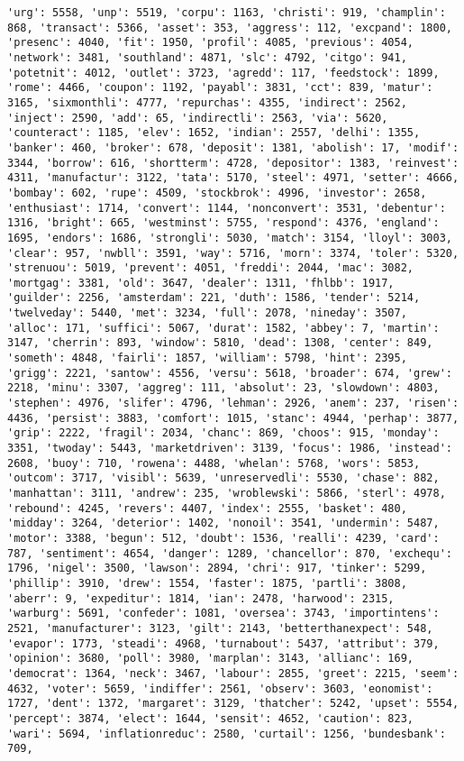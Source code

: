 \documentclass[11pt]{article}
\begin{document}
\begin{Verbatim}[commandchars=\\\{\}]
'urg': 5558, 'unp': 5519, 'corpu': 1163, 'christi': 919, 'champlin': 868, 'transact': 5366, 'asset': 353, 'aggress': 112, 'excpand': 1800, 'presenc': 4040, 'fit': 1950, 'profil': 4085, 'previous': 4054, 'network': 3481, 'southland': 4871, 'slc': 4792, 'citgo': 941, 'potetnit': 4012, 'outlet': 3723, 'agredd': 117, 'feedstock': 1899, 'rome': 4466, 'coupon': 1192, 'payabl': 3831, 'cct': 839, 'matur': 3165, 'sixmonthli': 4777, 'repurchas': 4355, 'indirect': 2562, 'inject': 2590, 'add': 65, 'indirectli': 2563, 'via': 5620, 'counteract': 1185, 'elev': 1652, 'indian': 2557, 'delhi': 1355, 'banker': 460, 'broker': 678, 'deposit': 1381, 'abolish': 17, 'modif': 3344, 'borrow': 616, 'shortterm': 4728, 'depositor': 1383, 'reinvest': 4311, 'manufactur': 3122, 'tata': 5170, 'steel': 4971, 'setter': 4666, 'bombay': 602, 'rupe': 4509, 'stockbrok': 4996, 'investor': 2658, 'enthusiast': 1714, 'convert': 1144, 'nonconvert': 3531, 'debentur': 1316, 'bright': 665, 'westminst': 5755, 'respond': 4376, 'england': 1695, 'endors': 1686, 'strongli': 5030, 'match': 3154, 'lloyl': 3003, 'clear': 957, 'nwbll': 3591, 'way': 5716, 'morn': 3374, 'toler': 5320, 'strenuou': 5019, 'prevent': 4051, 'freddi': 2044, 'mac': 3082, 'mortgag': 3381, 'old': 3647, 'dealer': 1311, 'fhlbb': 1917, 'guilder': 2256, 'amsterdam': 221, 'duth': 1586, 'tender': 5214, 'twelveday': 5440, 'met': 3234, 'full': 2078, 'nineday': 3507, 'alloc': 171, 'suffici': 5067, 'durat': 1582, 'abbey': 7, 'martin': 3147, 'cherrin': 893, 'window': 5810, 'dead': 1308, 'center': 849, 'someth': 4848, 'fairli': 1857, 'william': 5798, 'hint': 2395, 'grigg': 2221, 'santow': 4556, 'versu': 5618, 'broader': 674, 'grew': 2218, 'minu': 3307, 'aggreg': 111, 'absolut': 23, 'slowdown': 4803, 'stephen': 4976, 'slifer': 4796, 'lehman': 2926, 'anem': 237, 'risen': 4436, 'persist': 3883, 'comfort': 1015, 'stanc': 4944, 'perhap': 3877, 'grip': 2222, 'fragil': 2034, 'chanc': 869, 'choos': 915, 'monday': 3351, 'twoday': 5443, 'marketdriven': 3139, 'focus': 1986, 'instead': 2608, 'buoy': 710, 'rowena': 4488, 'whelan': 5768, 'wors': 5853, 'outcom': 3717, 'visibl': 5639, 'unreservedli': 5530, 'chase': 882, 'manhattan': 3111, 'andrew': 235, 'wroblewski': 5866, 'sterl': 4978, 'rebound': 4245, 'revers': 4407, 'index': 2555, 'basket': 480, 'midday': 3264, 'deterior': 1402, 'nonoil': 3541, 'undermin': 5487, 'motor': 3388, 'begun': 512, 'doubt': 1536, 'realli': 4239, 'card': 787, 'sentiment': 4654, 'danger': 1289, 'chancellor': 870, 'exchequ': 1796, 'nigel': 3500, 'lawson': 2894, 'chri': 917, 'tinker': 5299, 'phillip': 3910, 'drew': 1554, 'faster': 1875, 'partli': 3808, 'aberr': 9, 'expeditur': 1814, 'ian': 2478, 'harwood': 2315, 'warburg': 5691, 'confeder': 1081, 'oversea': 3743, 'importintens': 2521, 'manufacturer': 3123, 'gilt': 2143, 'betterthanexpect': 548, 'evapor': 1773, 'steadi': 4968, 'turnabout': 5437, 'attribut': 379, 'opinion': 3680, 'poll': 3980, 'marplan': 3143, 'allianc': 169, 'democrat': 1364, 'neck': 3467, 'labour': 2855, 'greet': 2215, 'seem': 4632, 'voter': 5659, 'indiffer': 2561, 'observ': 3603, 'eonomist': 1727, 'dent': 1372, 'margaret': 3129, 'thatcher': 5242, 'upset': 5554, 'percept': 3874, 'elect': 1644, 'sensit': 4652, 'caution': 823, 'wari': 5694, 'inflationreduc': 2580, 'curtail': 1256, 'bundesbank': 709, 
\end{Verbatim}
\end{document}
